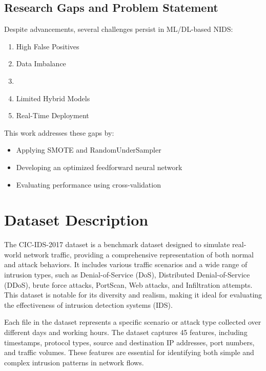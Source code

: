 \documentclass[conference]{IEEEtran}
\begin{document}
\subsection{Research Gaps and Problem Statement}
Despite advancements, several challenges persist in ML/DL-based NIDS:

\begin{enumerate}
    
    \item High False Positives \cite{sharafaldin2018toward}
    \item Data Imbalance \cite{ghani2023deep}
    \item \cite{ahmad2021network}
    \item Limited Hybrid Models \cite{cao2022network}
    \item Real-Time Deployment \cite{injadat2020multi}
\end{enumerate}

This work addresses these gaps by:
\begin{itemize}
   
    \item Applying SMOTE and RandomUnderSampler
    \item Developing an optimized feedforward neural network
    \item Evaluating performance using cross-validation
\end{itemize}


\section{Dataset Description}
The CIC-IDS-2017 dataset is a benchmark dataset designed to simulate real-world network traffic, providing a comprehensive representation of both normal and attack behaviors. It includes various traffic scenarios and a wide range of intrusion types, such as Denial-of-Service (DoS), Distributed Denial-of-Service (DDoS), brute force attacks, PortScan, Web attacks, and Infiltration attempts. This dataset is notable for its diversity and realism, making it ideal for evaluating the effectiveness of intrusion detection systems (IDS).

Each file in the dataset represents a specific scenario or attack type collected over different days and working hours. The dataset captures 45 features, including timestamps, protocol types, source and destination IP addresses, port numbers, and traffic volumes. These features are essential for identifying both simple and complex intrusion patterns in network flows.
\end{document}
